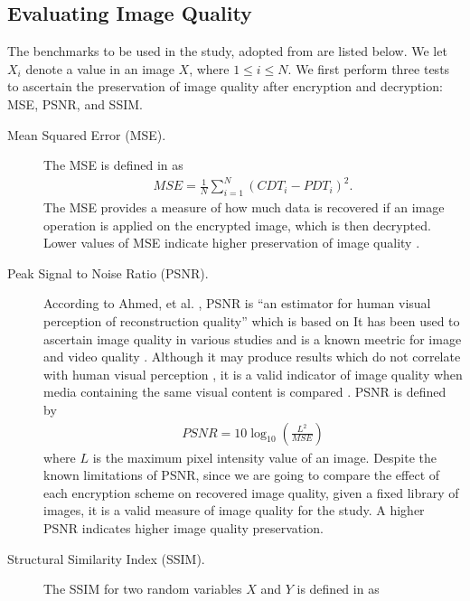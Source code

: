 \subsection{Evaluating Image Quality}
The benchmarks to be used in the study, adopted from \cite{ahmed_benchmark_2016, ahmad_efficiency_2012, wu_npcr_2011} are listed below. We let $X_i$ denote a value in an image $X$, where $1 \leq i \leq N$.
We first perform three tests to ascertain the preservation of image quality after encryption and decryption: MSE, PSNR, and SSIM.
\begin{description}
	\item [Mean Squared Error (MSE).] The MSE is defined in \cite{ahmed_benchmark_2016} as
	\begin{align}
		MSE = \frac{1}{N}\sum_{i=1}^{N}{(CDT_i - PDT_i)^2}.
	\end{align}
	The MSE provides a measure of how much data is recovered if an image operation is applied on the encrypted image, which is then decrypted. Lower values of MSE indicate higher preservation of image quality \cite{ahmed_benchmark_2016, ahmad_efficiency_2012}.
	\item [Peak Signal to Noise Ratio (PSNR).]
	According to Ahmed, et al. \cite{ahmed_benchmark_2016}, PSNR is ``an estimator for human visual perception of reconstruction quality'' which is based on  It has been used to ascertain image quality in various studies and is a known meetric for image and video quality \cite{upmanyu_efficient_2009, jain_image_2016, akramullah_video_2014}. Although it may produce results which do not correlate with human visual perception \cite{huynh-thu_accuracy_2012, ahmed_benchmark_2016}, it is a valid indicator of image quality when media containing the same visual content is compared \cite{huynh-thu_accuracy_2012}.
	PSNR is defined by
	\begin{align}
		PSNR = 10\log_{10}{\left( \frac{L^2}{MSE} \right)}
	\end{align}
	where $L$ is the maximum pixel intensity value of an image.
	Despite the known limitations of PSNR, since we are going to compare the effect of each encryption scheme on recovered image quality, given a fixed library of images, it is a valid measure of image quality for the study. A higher PSNR indicates higher image quality preservation.
	\item [Structural Similarity Index (SSIM).]
	The SSIM for two random variables $X$ and $Y$ is defined in \cite{ahmed_benchmark_2016, akramullah_video_2014} as
	\begin{align}

\end{align}
\end{description}
